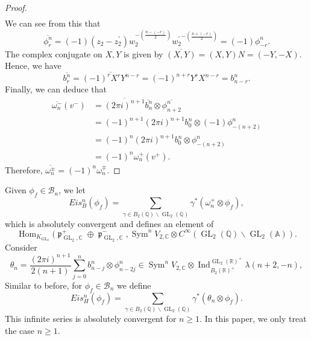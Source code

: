 \documentclass[11pt, a4paper]{amsart}
\theoremstyle{plain}
\theoremstyle{definition}
\numberwithin{equation}{section}
\def\AAA{\mathbb{A}}
\def\CC{\mathbb{C}}
\def\QQ{\mathbb{Q}}
\def\RR{\mathbb{R}}
\DeclareMathOperator{\Hom}{Hom}
\DeclareMathOperator{\Sym}{Sym}
\DeclareMathOperator{\Ind}{Ind}
\DeclareMathOperator{\GL}{\mathrm{GL}}
\DeclareMathOperator{\liep}{\mathfrak p}
\begin{document}
\begin{proof}
\begin{align*}
        \end{align*}
        We can see from this that 
        \begin{equation*}
            \overline{\phi^{n}_{r}} = (-1) (z_2 - z_2^{\prime}) w_{2}^{-(\frac{n - (-r)}{2})}{w_{2}^{\prime}}^{-(\frac{n + (-r)}{2})} = (-1) \phi^{n}_{-r}. 
        \end{equation*}
        The complex conjugate on $X, Y$ is given by $\overline{(X, Y)} = (X, Y)N = (-Y, -X)$. Hence, we have 
        \begin{equation*}
            \overline{b^{n}_{r}} = \overline{(-1)^{r}X^{r}Y^{n - r}} = (-1)^{n+r}Y^{r}X^{n - r} = b^{n}_{n - r}. 
        \end{equation*}
        Finally, we can deduce that 
        \begin{align*}
            \overline{\omega_{n}^{-}}(v^{-}) &= \overline{(2 \pi i)^{n + 1}} \overline{b^n_n} \otimes \overline{\phi^{n}_{n + 2}} \\
                                        & = (-1)^{n + 1} (2\pi{i})^{n + 1}  b^{n}_{0} \otimes (-1) \phi^{n}_{-(n + 2)} \\
                                        & = (-1)^{n}(2\pi{i})^{n + 1} b^{n}_{0} \otimes \phi^{n}_{-(n + 2)} \\
                                        & = (-1)^{n}\omega^{+}_{n}(v^{+}). 
        \end{align*}
        Therefore, $\overline{\omega^{\pm}_{n}} = (-1)^{n}\omega_n^{\mp}$. 
\end{proof}

Given $\phi_{f} \in \mathcal{B}_{n}$, we let 
\begin{equation*}
   Eis_{B}^{n}(\phi_f) = \sum_{\gamma \in B_{2}(\QQ) \backslash \GL_2(\QQ)} \gamma^{*}(\omega_n^{+} \otimes \phi_f),
\end{equation*}
which is absolutely convergent \cite[(6.3.1)]{Kings98} and defines an element of 
\begin{equation*}
    \Hom_{K_{\GL_2}}(\liep_{\GL_{2}, \CC}^{+}\oplus \liep_{\GL_{2}, \CC}^{-}, \Sym^{n}V_{2, \CC} \otimes C^{\infty}(\GL_2(\QQ) \backslash \GL_2(\AAA)). 
\end{equation*}
Consider
\begin{equation*}
    \theta_{n} = \frac{(2 \pi i)^{n + 1}}{2(n + 1)}\sum\limits_{j = 0}^{n}  b_{n - j}^{n} \otimes \phi_{n - 2j}^{n} \in \Sym^{n}V_{2, \CC} \otimes \Ind_{B_{2}(\RR)^{+}}^{\GL_2(\RR)^{+}} \lambda(n + 2, -n),
\end{equation*}
Similar to before, for $\phi_{f} \in \mathcal{B}_{n}$ we define 
\begin{equation}
\label{eqn:Eis_symbol_Hodge}
    Eis_{H}^{n}(\phi_f) = \sum_{\gamma \in B_{2}(\QQ) \backslash \GL_2(\QQ)} \gamma^{*}(\theta_{n} \otimes \phi_f).
\end{equation}
This infinite series is absolutely convergent for $n \ge 1$. In this paper, we only treat the case $n \ge 1$. 
\end{document}
